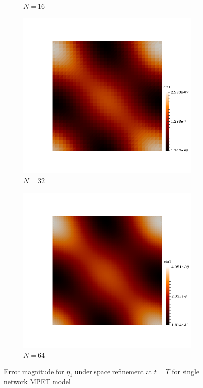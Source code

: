 \begin{figure}[h!]
\begin{subfigure}[b]{0.24\textwidth}
    \caption{$N=16$}
  \end{subfigure}
  \begin{subfigure}[b]{0.24\textwidth}
    \includegraphics[width=\textwidth,height=\textheight,keepaspectratio,height=\textheight,keepaspectratio]{figures/1_mpet/space/eta1_32.png}
    \caption{$N=32$}
  \end{subfigure}
  \begin{subfigure}[b]{0.24\textwidth}
    \includegraphics[width=\textwidth,height=\textheight,keepaspectratio,height=\textheight,keepaspectratio]{figures/1_mpet/space/eta1_64.png}
    \caption{$N=64$}
  \end{subfigure}
  \caption{Error magnitude for $\eta_1$ under space refinement at $t=T$ for single network MPET model} \label{fig:biot_eta1}
\end{figure}

